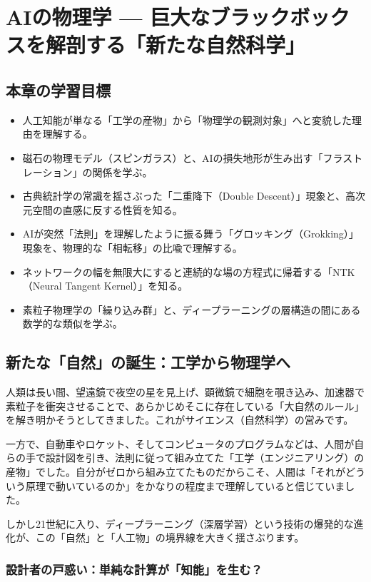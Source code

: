 \chapter{AIの物理学 --- 巨大なブラックボックスを解剖する「新たな自然科学」}

\section*{本章の学習目標}
\begin{itemize}
\item 人工知能が単なる「工学の産物」から「物理学の観測対象」へと変貌した理由を理解する。
\item 磁石の物理モデル（スピンガラス）と、AIの損失地形が生み出す「フラストレーション」の関係を学ぶ。
\item 古典統計学の常識を揺さぶった「二重降下（Double Descent）」現象と、高次元空間の直感に反する性質を知る。
\item AIが突然「法則」を理解したように振る舞う「グロッキング（Grokking）」現象を、物理的な「相転移」の比喩で理解する。
\item ネットワークの幅を無限大にすると連続的な場の方程式に帰着する「NTK（Neural Tangent Kernel）」を知る。
\item 素粒子物理学の「繰り込み群」と、ディープラーニングの層構造の間にある数学的な類似を学ぶ。
\end{itemize}

\section{新たな「自然」の誕生：工学から物理学へ}

人類は長い間、望遠鏡で夜空の星を見上げ、顕微鏡で細胞を覗き込み、加速器で素粒子を衝突させることで、あらかじめそこに存在している「大自然のルール」を解き明かそうとしてきました。これがサイエンス（自然科学）の営みです。

一方で、自動車やロケット、そしてコンピュータのプログラムなどは、人間が自らの手で設計図を引き、法則に従って組み立てた「工学（エンジニアリング）の産物」でした。自分がゼロから組み立てたものだからこそ、人間は「それがどういう原理で動いているのか」をかなりの程度まで理解していると信じていました。

しかし21世紀に入り、ディープラーニング（深層学習）という技術の爆発的な進化が、この「自然」と「人工物」の境界線を大きく揺さぶります。

\subsection{設計者の戸惑い：単純な計算が「知能」を生む？}

